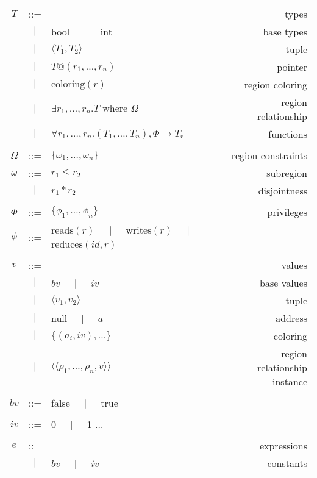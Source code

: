 \newcommand{\oton}[1]{{#1}_1,\ldots,{#1}_n}
\newcommand{\otok}[2]{{#2}_1,\ldots,{#2}_{#1}}

\begin{table*}
\centering
{\small
\begin{tabular}{cclr}

$T$ & ::= &  & types \\
  &$\mid$& bool $\;\;\;\mid\;\;\;$ int & base types \\
  &$\mid$& $\langle T_1, T_2 \rangle$ & tuple \\
  &$\mid$& $T@(\oton{r})$ & pointer \\
  &$\mid$& $\text{coloring}(r)$ & region coloring \\
  &$\mid$& $\exists \oton{r}. T\text{ where }\Omega$ & region relationship \\
  &$\mid$& $\forall \oton{r}. (\oton{T}), \Phi \rightarrow T_r$ & functions \\
\\
$\Omega$ & ::= & $\{ \oton{\omega} \}$ & region constraints \\
$\omega$ & ::= & $r_1 \leq r_2$ & subregion \\
  &$\mid$& $r_1 * r_2$ & disjointness \\
\\
$\Phi$ & ::= & $\{ \oton{\phi} \}$ & privileges \\
$\phi$ & ::= & reads$(r)$ $\;\;\;\mid\;\;\;$ writes$(r)$ $\;\;\;\mid\;\;\;$ reduces$(id,r)$ & \\
\\
$v$ & ::= & & values \\
  &$\mid$& $bv$ $\;\;\;\mid\;\;\;$ $iv$ & base values \\
  &$\mid$& $\langle v_1, v_2 \rangle$ & tuple \\
  &$\mid$& null $\;\;\;\mid\;\;\;$ $a$ & address \\
  &$\mid$& $\{ (a_i, iv), \ldots \}$ & coloring \\
  &$\mid$& $\langle \langle \oton{\rho}, v\rangle \rangle$ & region relationship instance \\
\\
$bv$ & ::= & false $\;\;\;\mid\;\;\;$ true \\
\\
$iv$ & ::= & 0 $\;\;\;\mid\;\;\;$ 1 $\ldots$ \\
\\
$e$ & ::= & & expressions \\
  &$\mid$& $bv$ $\;\;\;\mid\;\;\;$ $iv$ & constants \\

\end{tabular}}
\end{table*}
